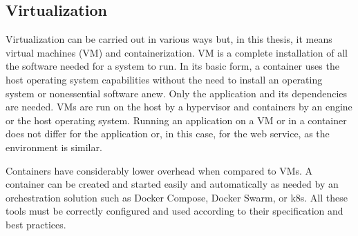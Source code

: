 \subsection{Virtualization}
\begin{sloppypar}
    Virtualization can be carried out in various ways but, in this thesis, it
    means virtual machines (VM) and containerization. VM is a complete
    installation of all the software needed for a system to run. In its basic
    form, a container uses the host operating system capabilities without the
    need to install an operating system or nonessential software anew. Only the
    application and its dependencies are needed. VMs are run on the host by a
    hypervisor and containers by an engine or the host operating system. Running
    an application on a VM or in a container does not differ for the application
    or, in this case, for the web service, as the environment is similar.
\end{sloppypar}
\begin{sloppypar}
    Containers have considerably lower overhead when compared to VMs. A
    container can be created and started easily and automatically as needed by
    an orchestration solution such as Docker Compose, Docker Swarm, or k8s. All
    these tools must be correctly configured and used according to their
    specification and best practices.
\end{sloppypar}

